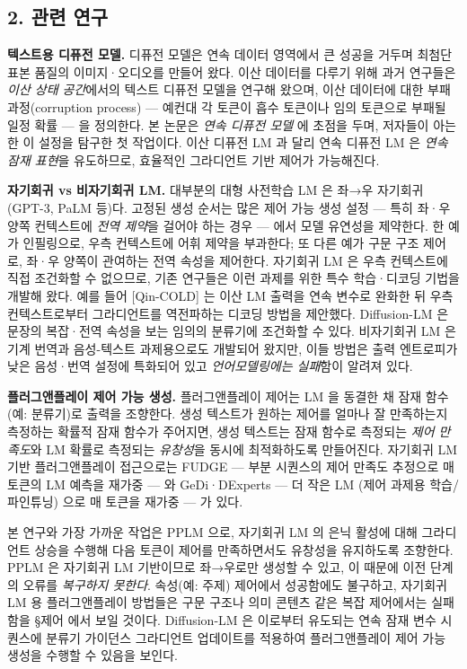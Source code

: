 \documentclass[
]{article}
\begin{document}
\hypertarget{uxad00uxb828-uxc5f0uxad6c}{%
\subsection{2. 관련 연구}\label{uxad00uxb828-uxc5f0uxad6c}}

\textbf{텍스트용 디퓨전 모델.} 디퓨전 모델은 연속 데이터 영역에서 큰
성공을 거두며 최첨단 표본 품질의 이미지·오디오를 만들어 왔다. 이산
데이터를 다루기 위해 과거 연구들은 \emph{이산 상태 공간}에서의 텍스트
디퓨전 모델을 연구해 왔으며, 이산 데이터에 대한 부패 과정(corruption
process) --- 예컨대 각 토큰이 흡수 토큰이나 임의 토큰으로 부패될 일정
확률 --- 을 정의한다. 본 논문은 \emph{연속 디퓨전 모델} 에 초점을 두며,
저자들이 아는 한 이 설정을 탐구한 첫 작업이다. 이산 디퓨전 LM 과 달리
연속 디퓨전 LM 은 \emph{연속 잠재 표현}을 유도하므로, 효율적인
그라디언트 기반 제어가 가능해진다.

\textbf{자기회귀 vs 비자기회귀 LM.} 대부분의 대형 사전학습 LM 은 좌→우
자기회귀(GPT-3, PaLM 등)다. 고정된 생성 순서는 많은 제어 가능 생성 설정
--- 특히 좌·우 양쪽 컨텍스트에 \emph{전역 제약}을 걸어야 하는 경우 ---
에서 모델 유연성을 제약한다. 한 예가 인필링으로, 우측 컨텍스트에 어휘
제약을 부과한다; 또 다른 예가 구문 구조 제어로, 좌·우 양쪽이 관여하는
전역 속성을 제어한다. 자기회귀 LM 은 우측 컨텍스트에 직접 조건화할 수
없으므로, 기존 연구들은 이런 과제를 위한 특수 학습·디코딩 기법을 개발해
왔다. 예를 들어 {[}Qin-COLD{]} 는 이산 LM 출력을 연속 변수로 완화한 뒤
우측 컨텍스트로부터 그라디언트를 역전파하는 디코딩 방법을 제안했다.
Diffusion-LM 은 문장의 복잡·전역 속성을 보는 임의의 분류기에 조건화할 수
있다. 비자기회귀 LM 은 기계 번역과 음성-텍스트 과제용으로도 개발되어
왔지만, 이들 방법은 출력 엔트로피가 낮은 음성·번역 설정에 특화되어 있고
\emph{언어모델링에는 실패}함이 알려져 있다.

\textbf{플러그앤플레이 제어 가능 생성.} 플러그앤플레이 제어는 LM 을
동결한 채 잠재 함수(예: 분류기)로 출력을 조향한다. 생성 텍스트가 원하는
제어를 얼마나 잘 만족하는지 측정하는 확률적 잠재 함수가 주어지면, 생성
텍스트는 잠재 함수로 측정되는 \emph{제어 만족도}와 LM 확률로 측정되는
\emph{유창성}을 동시에 최적화하도록 만들어진다. 자기회귀 LM 기반
플러그앤플레이 접근으로는 FUDGE --- 부분 시퀀스의 제어 만족도 추정으로
매 토큰의 LM 예측을 재가중 --- 와 GeDi·DExperts --- 더 작은 LM (제어
과제용 학습/파인튜닝) 으로 매 토큰을 재가중 --- 가 있다.

본 연구와 가장 가까운 작업은 PPLM 으로, 자기회귀 LM 의 은닉 활성에 대해
그라디언트 상승을 수행해 다음 토큰이 제어를 만족하면서도 유창성을
유지하도록 조향한다. PPLM 은 자기회귀 LM 기반이므로 좌→우로만 생성할 수
있고, 이 때문에 이전 단계의 오류를 \emph{복구하지 못한다}. 속성(예:
주제) 제어에서 성공함에도 불구하고, 자기회귀 LM 용 플러그앤플레이
방법들은 구문 구조나 의미 콘텐츠 같은 복잡 제어에서는 실패함을 §제어
에서 보일 것이다. Diffusion-LM 은 이로부터 유도되는 연속 잠재 변수
시퀀스에 분류기 가이던스 그라디언트 업데이트를 적용하여 플러그앤플레이
제어 가능 생성을 수행할 수 있음을 보인다.
\end{document}
